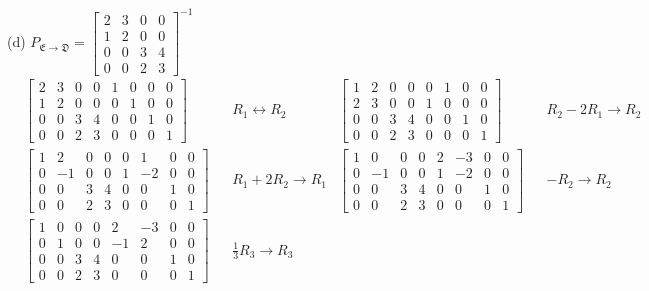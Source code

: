 \documentclass{report}
\begin{document}
\noindent
(d) $P_{\mathfrak{E}\rightarrow\mathfrak{D}} =
\begin{bmatrix}
2 & 3 & 0 & 0 \\
1 & 2 & 0 & 0 \\
0 & 0 & 3 & 4 \\
0 & 0 & 2 & 3
\end{bmatrix} ^{-1}$
\begin{align*}
	&\left[\begin{array}{cccc|cccc}
		2 & 3 & 0 & 0 & 1 & 0 & 0 & 0 \\
		1 & 2 & 0 & 0 & 0 & 1 & 0 & 0 \\
		0 & 0 & 3 & 4 & 0 & 0 & 1 & 0 \\
		0 & 0 & 2 & 3 & 0 & 0 & 0 & 1
	\end{array}\right]
	&& R_1 \leftrightarrow R_2
	&\left[\begin{array}{cccc|cccc}
		1 & 2 & 0 & 0 & 0 & 1 & 0 & 0 \\
		2 & 3 & 0 & 0 & 1 & 0 & 0 & 0 \\
		0 & 0 & 3 & 4 & 0 & 0 & 1 & 0 \\
		0 & 0 & 2 & 3 & 0 & 0 & 0 & 1
	\end{array}\right]
	&& R_2 - 2R_1 \rightarrow R_2 \\
	&\left[\begin{array}{cccc|cccc}
		1 & 2 & 0 & 0 & 0 & 1 & 0 & 0 \\
		0 & -1 & 0 & 0 & 1 & -2 & 0 & 0 \\
		0 & 0 & 3 & 4 & 0 & 0 & 1 & 0 \\
		0 & 0 & 2 & 3 & 0 & 0 & 0 & 1
	\end{array}\right]
	&& R_1 + 2R_2 \rightarrow R_1
	&\left[\begin{array}{cccc|cccc}
		1 & 0 & 0 & 0 & 2 & -3 & 0 & 0 \\
		0 & -1 & 0 & 0 & 1 & -2 & 0 & 0 \\
		0 & 0 & 3 & 4 & 0 & 0 & 1 & 0 \\
		0 & 0 & 2 & 3 & 0 & 0 & 0 & 1
	\end{array}\right]
	&& -R_2 \rightarrow R_2 \\
	&\left[\begin{array}{cccc|cccc}
		1 & 0 & 0 & 0 & 2 & -3 & 0 & 0 \\
		0 & 1 & 0 & 0 & -1 & 2 & 0 & 0 \\
		0 & 0 & 3 & 4 & 0 & 0 & 1 & 0 \\
		0 & 0 & 2 & 3 & 0 & 0 & 0 & 1
	\end{array}\right]
	&& \frac{1}{3}R_3\rightarrow R_3

\end{align*}
\end{document}
